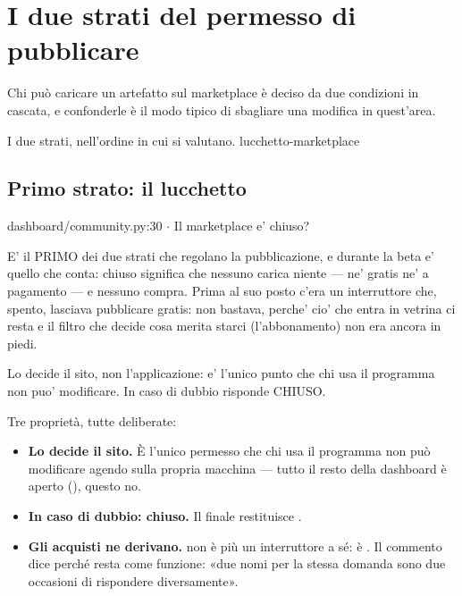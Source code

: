 \section{I due strati del permesso di pubblicare}\label{sez:lucchetto}
\raggedbottom

Chi può caricare un artefatto sul marketplace è deciso da due condizioni in
cascata, e confonderle è il modo tipico di sbagliare una modifica in
quest'area.

  {I due strati, nell'ordine in cui si valutano.}
  {lucchetto-marketplace}

\subsection{Primo strato: il lucchetto}

\begin{commento}{dashboard/community.py:30 $\cdot$ }
Il marketplace e' chiuso?

E' il PRIMO dei due strati che regolano la pubblicazione, e durante la
beta e' quello che conta: chiuso significa che nessuno carica niente — ne'
gratis ne' a pagamento — e nessuno compra. Prima al suo posto c'era un
interruttore che, spento, lasciava pubblicare gratis: non bastava, perche'
cio' che entra in vetrina ci resta e il filtro che decide cosa merita
starci (l'abbonamento) non era ancora in piedi.

Lo decide il sito, non l'applicazione: e' l'unico punto che chi usa il
programma non puo' modificare. In caso di dubbio risponde CHIUSO.
\end{commento}

\noindent
Tre proprietà, tutte deliberate:

\begin{itemize}
  \item \textbf{Lo decide il sito.} È l'unico permesso che chi usa il
        programma non può modificare agendo sulla propria macchina --- tutto
        il resto della dashboard è aperto (), questo no.
  \item \textbf{In caso di dubbio: chiuso.} Il  finale restituisce
        .
  \item \textbf{Gli acquisti ne derivano.}  non è
        più un interruttore a sé: è . Il
        commento dice perché resta come funzione: «due nomi per la stessa
        domanda sono due occasioni di rispondere diversamente».
\end{itemize}

